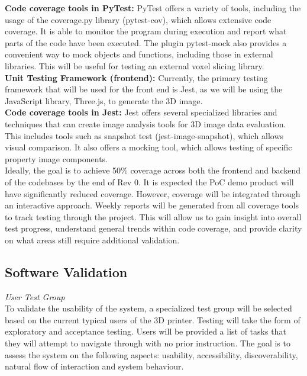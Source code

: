\documentclass[12pt, titlepage]{article}
\begin{document}
\noindent\textbf{Code coverage tools  in PyTest:} PyTest offers a variety of tools, including the usage of the coverage.py library (pytest-cov), which allows extensive code coverage. It is able to monitor the program during execution and report what parts of the code have been executed. The plugin pytest-mock also provides a convenient way to mock objects and functions, including those in external libraries. This will be useful for testing an external voxel slicing library.\\

\noindent\textbf{Unit Testing Framework (frontend):} Currently, the primary testing framework that will be used for the front end is Jest, as we will be using the JavaScript library, Three.js, to generate the 3D image.\\

\noindent\textbf{Code coverage tools in Jest:} Jest offers several specialized libraries and techniques that can create image analysis tools for 3D image data evaluation. This includes tools such as snapshot test (jest-image-snapshot), which allows visual comparison. It also offers a mocking tool, which allows testing of specific property image components.\\

\noindent Ideally, the goal is to achieve 50\% coverage across both the frontend and backend of the codebases by the end of Rev 0. It is expected the PoC demo product will have significantly reduced coverage. However, coverage will be integrated through an interactive approach. Weekly reports will be generated from all coverage tools to track testing through the project. This will allow us to gain insight into overall test progress, understand general trends within code coverage, and provide clarity on what areas still require additional validation.\\

\subsection{Software Validation}

\textit{User Test Group}\\
\noindent To validate the usability of the system, a specialized test group will be selected based on the current typical users of the 3D printer. Testing will take the form of exploratory and acceptance testing. Users will be provided a list of tasks that they will attempt to navigate through with no prior instruction. The goal is to assess the system on the following aspects: usability, accessibility, discoverability, natural flow of interaction and system behaviour.\\
\end{document}
